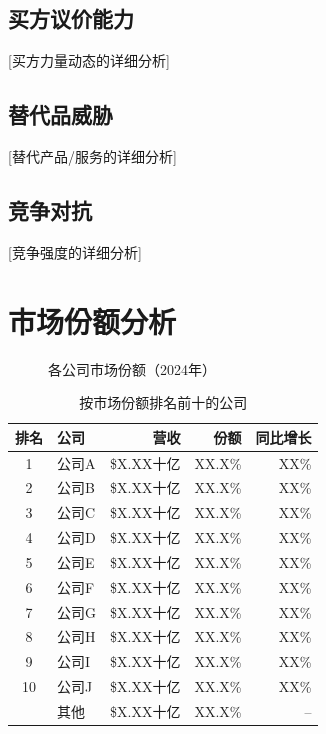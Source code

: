 \documentclass[11pt,letterpaper]{report}
\begin{document}
{\subsection{买方议价能力}
[买方力量动态的详细分析]

\subsection{替代品威胁}
[替代产品/服务的详细分析]

\subsection{竞争对抗}
[竞争强度的详细分析]

\section{市场份额分析}


\begin{figure}[htbp]
\centering
\caption{各公司市场份额（2024年）}
\label{fig:market_share}
\end{figure}

\begin{table}[htbp]
\centering
\caption{按市场份额排名前十的公司}
\begin{tabular}{@{}clrrr@{}}
\toprule
\textbf{排名} & \textbf{公司} & \textbf{营收} & \textbf{份额} & \textbf{同比增长} \\
\midrule
1 & 公司A & \$X.XX十亿 & XX.X\% & \trendup{} XX\% \\
\rowcolor{tablealt} 2 & 公司B & \$X.XX十亿 & XX.X\% & \trendup{} XX\% \\
3 & 公司C & \$X.XX十亿 & XX.X\% & \trendflat{} XX\% \\
\rowcolor{tablealt} 4 & 公司D & \$X.XX十亿 & XX.X\% & \trendup{} XX\% \\
5 & 公司E & \$X.XX十亿 & XX.X\% & \trenddown{} XX\% \\
\rowcolor{tablealt} 6 & 公司F & \$X.XX十亿 & XX.X\% & \trendup{} XX\% \\
7 & 公司G & \$X.XX十亿 & XX.X\% & \trendup{} XX\% \\
\rowcolor{tablealt} 8 & 公司H & \$X.XX十亿 & XX.X\% & \trendflat{} XX\% \\
9 & 公司I & \$X.XX十亿 & XX.X\% & \trendup{} XX\% \\
\rowcolor{tablealt} 10 & 公司J & \$X.XX十亿 & XX.X\% & \trenddown{} XX\% \\
\midrule
& 其他 & \$X.XX十亿 & XX.X\% & -- \\
\bottomrule
\end{tabular}
\label{tab:market_share}
\end{table}

}
\end{document}
